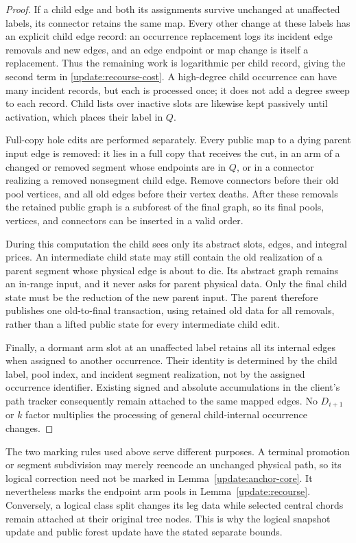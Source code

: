 \begin{proof}
If a child edge and both its assignments survive unchanged at
unaffected labels, its connector retains the same map.  Every
other change at these labels has an explicit child edge record:
an occurrence replacement logs its incident edge removals and
new edges, and an edge endpoint or map change is itself a
replacement.  Thus the remaining work is logarithmic per child
record, giving the second term in
\eqref{update:recourse-cost}.  A high-degree child occurrence
can have many incident records, but each is processed once; it
does not add a degree sweep to each record.  Child lists over
inactive slots are likewise kept passively until activation,
which places their label in $Q$.

Full-copy hole edits are performed separately.  Every public map
to a dying parent input edge is removed: it lies in a full copy
that receives the cut, in an arm of a changed or removed segment
whose endpoints are in $Q$, or in a connector realizing a removed
nonsegment child edge.  Remove connectors before their old pool
vertices, and all old edges before their vertex deaths.  After
these removals the retained public graph is a subforest of the
final graph, so its final pools, vertices, and connectors can be
inserted in a valid order.

During this computation the child sees only its abstract slots,
edges, and integral prices.  An intermediate child state may
still contain the old realization of a parent segment whose
physical edge is about to die.  Its abstract graph remains an
in-range input, and it never asks for parent physical data.
Only the final child state must be the reduction of the new
parent input.  The parent therefore publishes one old-to-final
transaction, using retained old data for all removals, rather
than a lifted public state for every intermediate child edit.

Finally, a dormant arm slot at an unaffected label retains all
its internal edges when assigned to another occurrence.  Their
identity is determined by the child label, pool index, and
incident segment realization, not by the assigned occurrence
identifier.  Existing signed and absolute accumulations in the
client's path tracker consequently remain attached to the same
mapped edges.  No $D_{i+1}$ or $k$ factor multiplies the processing
of general child-internal occurrence changes.
\end{proof}

The two marking rules used above serve different purposes.  A
terminal promotion or segment subdivision may merely reencode
an unchanged physical path, so its logical correction need not
be marked in Lemma~\ref{update:anchor-core}.  It nevertheless
marks the endpoint arm pools in Lemma~\ref{update:recourse}.
Conversely, a logical class split changes its leg data while
selected central chords remain attached at their original tree
nodes.  This is why the logical snapshot update and public
forest update have the stated separate bounds.

